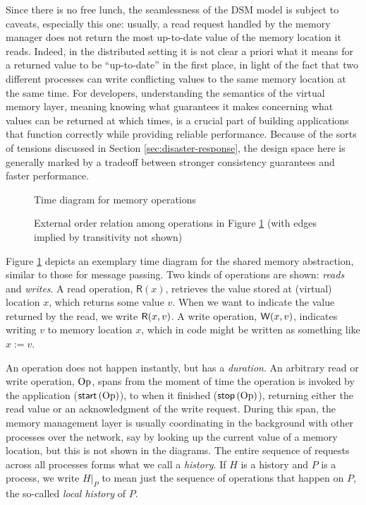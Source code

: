\documentclass[]             %
{NASA}                       %
\theoremstyle{definition}
\begin{document}
Since there is no free lunch, the seamlessness of the DSM model is
subject to caveats, especially this one: usually, a read request
handled by the memory manager does not return the most up-to-date
value of the memory location it reads. Indeed, in the distributed
setting it is not clear a priori what it means for a returned value to
be ``up-to-date'' in the first place, in light of the fact that two
different processes can write conflicting values to the same memory
location at the same time. For developers, understanding the semantics
of the virtual memory layer, meaning knowing what guarantees it makes
concerning what values can be returned at which times, is a crucial
part of building applications that function correctly while providing
reliable performance. Because of the sorts of tensions discussed in
Section \ref{sec:disaster-response}, the design space here is
generally marked by a tradeoff between stronger consistency guarantees
and faster performance.

\begin{figure}
    \centering
    
    \caption{Time diagram for memory operations}
    \label{fig:dsm-example-1}
\end{figure}

\begin{figure}
  \centering
  
  \caption{External order relation among operations in Figure \ref{fig:dsm-example-1} (with edges implied by transitivity not shown)}
  \label{fig:dsm-example-1-DAG}
\end{figure}

Figure \ref{fig:dsm-example-1} depicts an exemplary time diagram for
the shared memory abstraction, similar to those for message
passing. Two kinds of operations are shown: \emph{reads} and
\emph{writes}. A read operation, $\mathsf{R}(x)$, retrieves the value
stored at (virtual) location $x$, which returns some value $v$. When
we want to indicate the value returned by the read, we write
$\mathsf{R}\!\left(x, v\right)$. A write operation, $\mathsf{W}\!\left(x, v\right)$, indicates
writing $v$ to memory location $x$, which in code might be written as
something like $x := v$.

An operation does not happen instantly, but has a \emph{duration}. An
arbitrary read or write operation, $\mathrm{Op}$, spans from the moment of
time the operation is invoked by the application ($\mathsf{start}\left(\mathrm{Op}\right)$),
to when it finished ($\mathsf{stop}\left(\mathrm{Op}\right)$), returning either the read value
or an acknowledgment of the write request. During this span, the
memory management layer is usually coordinating in the background with
other processes over the network, say by looking up the current value
of a memory location, but this is not shown in the diagrams. The
entire sequence of requests across all processes forms what we call a
\emph{history}. If $H$ is a history and $P$ is a process, we write
$H|_P$ to mean just the sequence of operations that happen on $P$, the
so-called \emph{local history} of $P$.
\end{document}
